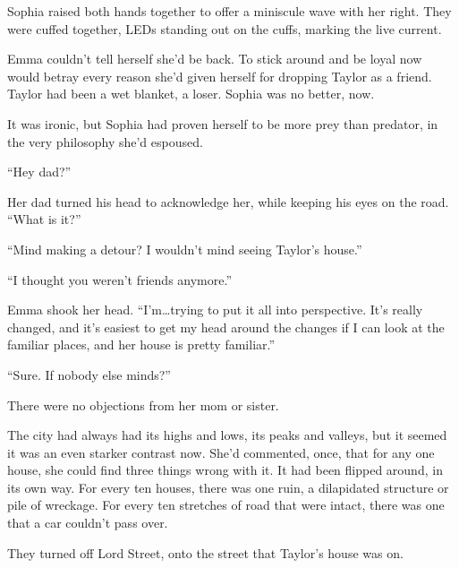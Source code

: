 Sophia raised both hands together to offer a miniscule wave with her right.  They were cuffed together, LEDs standing out on the cuffs, marking the live current.



Emma couldn't tell herself she'd be back.  To stick around and be loyal now would betray every reason she'd given herself for dropping Taylor as a friend.  Taylor had been a wet blanket, a loser.  Sophia was no better, now.



It was ironic, but Sophia had proven herself to be more prey than predator, in the very philosophy she'd espoused.



\sectionbreak



``Hey dad?''



Her dad turned his head to acknowledge her, while keeping his eyes on the road. ``What is it?''



``Mind making a detour?  I wouldn't mind seeing Taylor's house.''



``I thought you weren't friends anymore.''



Emma shook her head.  ``I'm\ldots trying to put it all into perspective.  It's really changed, and it's easiest to get my head around the changes if I can look at the familiar places, and her house is pretty familiar.''



``Sure.  If nobody else minds?''



There were no objections from her mom or sister.



The city had always had its highs and lows, its peaks and valleys, but it seemed it was an even starker contrast now.  She'd commented, once, that for any one house, she could find three things wrong with it.  It had been flipped around, in its own way.  For every ten houses, there was one ruin, a dilapidated structure or pile of wreckage.  For every ten stretches of road that were intact, there was one that a car couldn't pass over.



They turned off Lord Street, onto the street that Taylor's house was on.




